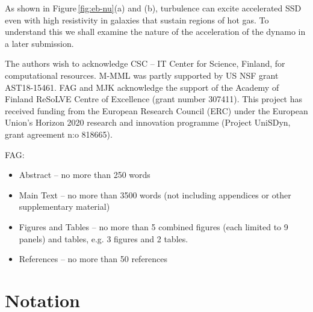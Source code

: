 \documentclass[preprint2]{aastex63}
\newcommand{\fag}[1]{\textcolor{midgreen}{FAG: #1}}
\begin{document}
As shown in Figure\,\ref{fig:eb-nu}(a) and (b), turbulence 
can excite accelerated SSD even with high resistivity in galaxies that
sustain regions of hot gas.
To understand this we shall examine the nature of the acceleration of the
dynamo in a later submission.





\acknowledgments
The authors wish to acknowledge CSC – IT Center for Science, Finland, for computational
resources.
 M-MML was partly supported by US NSF grant AST18-15461.
 FAG and MJK acknowledge the support of the Academy of Finland
ReSoLVE Centre of Excellence (grant number 307411).
This project has received funding from the European Research Council (ERC)
under the European Union's Horizon 2020 research and innovation
programme (Project UniSDyn, grant agreement n:o 818665).

{}


\appendix
\fag{
\begin{itemize}
\item
    Abstract – no more than 250 words
\item
    Main Text – no more than 3500 words (not including appendices or other supplementary material)
\item
    Figures and Tables – no more than 5 combined figures (each limited to 9 panels) and tables, e.g. 3 figures and 2 tables.
\item
    References – no more than 50 references
\end{itemize}}

\section{Notation}\label{sec:table}
\end{document}
